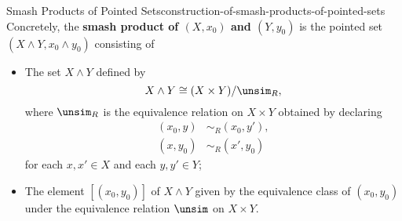 \begin{construction}{Smash Products of Pointed Sets}{construction-of-smash-products-of-pointed-sets}%
    Concretely, the \textbf{smash product of $(X,x_{0})$ and $(Y,y_{0})$} is the pointed set $(X\wedge Y,x_{0}\wedge y_{0})$ consisting of%
    \begin{itemize}
        \item{}The set $X\wedge Y$ defined by
            \[
                X\wedge Y%
                \cong%
                (X\times Y)/\unsim_{R},%
            \]%
            where $\unsim_{R}$ is the equivalence relation on $X\times Y$ obtained by declaring
            \begin{align*}
                (x_{0},y) &\sim_{R} (x_{0},y'),\\
                (x,y_{0}) &\sim_{R} (x',y_{0})
            \end{align*}
            for each $x,x'\in X$ and each $y,y'\in Y$;
        \item{}The element $[(x_{0},y_{0})]$ of $X\wedge Y$ given by the equivalence class of $(x_{0},y_{0})$ under the equivalence relation $\unsim$ on $X\times Y$.
    \end{itemize}
\end{construction}
